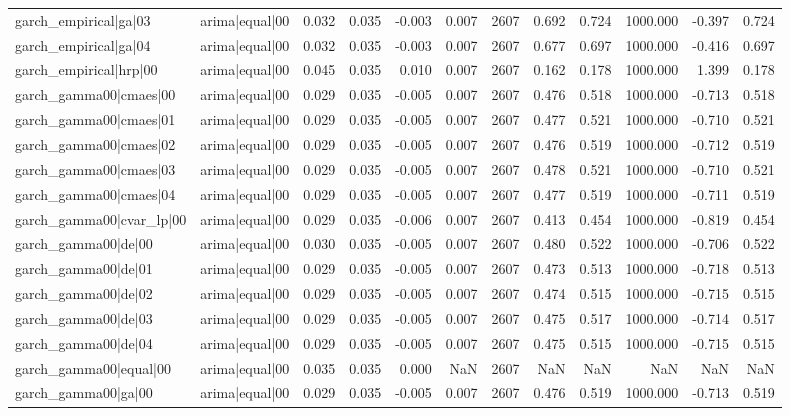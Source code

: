 \begin{table}
\begin{tabular}{llrrrrrrrrrr}
garch\_empirical|ga|03 & arima|equal|00 & 0.032 & 0.035 & -0.003 & 0.007 & 2607 & 0.692 & 0.724 & 1000.000 & -0.397 & 0.724 \\
garch\_empirical|ga|04 & arima|equal|00 & 0.032 & 0.035 & -0.003 & 0.007 & 2607 & 0.677 & 0.697 & 1000.000 & -0.416 & 0.697 \\
garch\_empirical|hrp|00 & arima|equal|00 & 0.045 & 0.035 & 0.010 & 0.007 & 2607 & 0.162 & 0.178 & 1000.000 & 1.399 & 0.178 \\
garch\_gamma00|cmaes|00 & arima|equal|00 & 0.029 & 0.035 & -0.005 & 0.007 & 2607 & 0.476 & 0.518 & 1000.000 & -0.713 & 0.518 \\
garch\_gamma00|cmaes|01 & arima|equal|00 & 0.029 & 0.035 & -0.005 & 0.007 & 2607 & 0.477 & 0.521 & 1000.000 & -0.710 & 0.521 \\
garch\_gamma00|cmaes|02 & arima|equal|00 & 0.029 & 0.035 & -0.005 & 0.007 & 2607 & 0.476 & 0.519 & 1000.000 & -0.712 & 0.519 \\
garch\_gamma00|cmaes|03 & arima|equal|00 & 0.029 & 0.035 & -0.005 & 0.007 & 2607 & 0.478 & 0.521 & 1000.000 & -0.710 & 0.521 \\
garch\_gamma00|cmaes|04 & arima|equal|00 & 0.029 & 0.035 & -0.005 & 0.007 & 2607 & 0.477 & 0.519 & 1000.000 & -0.711 & 0.519 \\
garch\_gamma00|cvar\_lp|00 & arima|equal|00 & 0.029 & 0.035 & -0.006 & 0.007 & 2607 & 0.413 & 0.454 & 1000.000 & -0.819 & 0.454 \\
garch\_gamma00|de|00 & arima|equal|00 & 0.030 & 0.035 & -0.005 & 0.007 & 2607 & 0.480 & 0.522 & 1000.000 & -0.706 & 0.522 \\
garch\_gamma00|de|01 & arima|equal|00 & 0.029 & 0.035 & -0.005 & 0.007 & 2607 & 0.473 & 0.513 & 1000.000 & -0.718 & 0.513 \\
garch\_gamma00|de|02 & arima|equal|00 & 0.029 & 0.035 & -0.005 & 0.007 & 2607 & 0.474 & 0.515 & 1000.000 & -0.715 & 0.515 \\
garch\_gamma00|de|03 & arima|equal|00 & 0.029 & 0.035 & -0.005 & 0.007 & 2607 & 0.475 & 0.517 & 1000.000 & -0.714 & 0.517 \\
garch\_gamma00|de|04 & arima|equal|00 & 0.029 & 0.035 & -0.005 & 0.007 & 2607 & 0.475 & 0.515 & 1000.000 & -0.715 & 0.515 \\
garch\_gamma00|equal|00 & arima|equal|00 & 0.035 & 0.035 & 0.000 & NaN & 2607 & NaN & NaN & NaN & NaN & NaN \\
garch\_gamma00|ga|00 & arima|equal|00 & 0.029 & 0.035 & -0.005 & 0.007 & 2607 & 0.476 & 0.519 & 1000.000 & -0.713 & 0.519 \\

\end{tabular}
\end{table}
